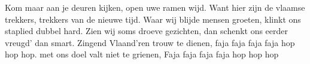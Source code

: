\beginverse*
Kom maar aan je deuren kijken,
open uwe ramen wijd.
Want hier zijn de vlaamse trekkers,
trekkers van de nieuwe tijd.
Waar wij blijde mensen groeten,
klinkt ons staplied dubbel hard.
Zien wij soms droeve gezichten,
dan schenkt ons eerder vreugd’ dan smart.
Zingend Vlaand’ren trouw te dienen,
faja faja faja faja hop hop hop.
met ons doel valt niet te grienen,
Faja faja faja faja hop hop hop

\endverse
\endsong